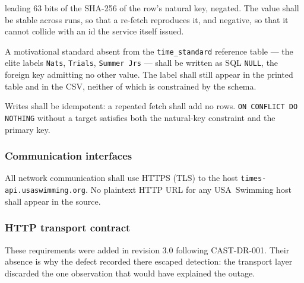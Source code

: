 \documentclass[12pt]{article}
\newcommand{\req}[1]{\textbf{[#1]}}
\begin{document}
\begin{description}[style=nextline]
        leading 63 bits of the SHA-256 of the row's natural key,
        negated.  The value shall be stable across runs, so that a
        re-fetch reproduces it, and negative, so that it cannot collide
        with an id the service itself issued.
  \item[\req{REQ-I-16}] A motivational standard absent from the
        \texttt{time\_standard} reference table --- the elite labels
        \texttt{Nats}, \texttt{Trials}, \texttt{Summer Jrs} --- shall be
        written as SQL \texttt{NULL}, the foreign key admitting no
        other value.  The label shall still appear in the printed table
        and in the CSV, neither of which is constrained by the schema.
  \item[\req{REQ-I-17}] Writes shall be idempotent: a repeated fetch
        shall add no rows.  \texttt{ON CONFLICT DO NOTHING} without a
        target satisfies both the natural-key constraint and the
        primary key.
\end{description}

\subsubsection{Communication interfaces}

\begin{description}[style=nextline]
  \item[\req{REQ-I-20}] All network communication shall use HTTPS
        (TLS) to the host \texttt{times-api.usaswimming.org}.  No
        plaintext HTTP URL for any USA~Swimming host shall appear in
        the source.
\end{description}

\subsubsection{HTTP transport contract}

These requirements were added in revision 3.0 following CAST-DR-001.
Their absence is why the defect recorded there escaped detection: the
transport layer discarded the one observation that would have explained
the outage.
\end{document}
